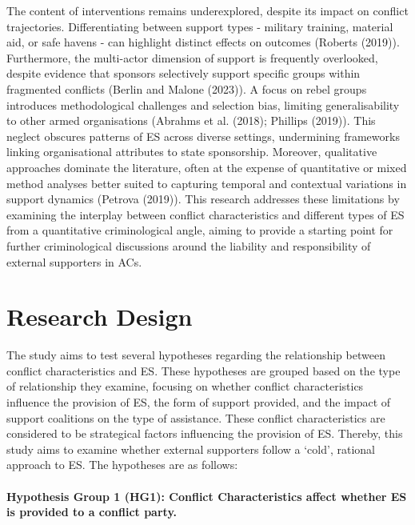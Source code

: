 \documentclass[
]{article}
\begin{document}
The content of interventions remains underexplored, despite its impact
on conflict trajectories. Differentiating between support types -
military training, material aid, or safe havens - can highlight distinct
effects on outcomes (Roberts (2019)). Furthermore, the multi-actor
dimension of support is frequently overlooked, despite evidence that
sponsors selectively support specific groups within fragmented conflicts
(Berlin and Malone (2023)). A focus on rebel groups introduces
methodological challenges and selection bias, limiting generalisability
to other armed organisations (Abrahms et al. (2018); Phillips (2019)).
This neglect obscures patterns of ES across diverse settings,
undermining frameworks linking organisational attributes to state
sponsorship. Moreover, qualitative approaches dominate the literature,
often at the expense of quantitative or mixed method analyses better
suited to capturing temporal and contextual variations in support
dynamics (Petrova (2019)). This research addresses these limitations by
examining the interplay between conflict characteristics and different
types of ES from a quantitative criminological angle, aiming to provide
a starting point for further criminological discussions around the
liability and responsibility of external supporters in ACs.

\section{Research Design}\label{research-design}

The study aims to test several hypotheses regarding the relationship
between conflict characteristics and ES. These hypotheses are grouped
based on the type of relationship they examine, focusing on whether
conflict characteristics influence the provision of ES, the form of
support provided, and the impact of support coalitions on the type of
assistance. These conflict characteristics are considered to be
strategical factors influencing the provision of ES. Thereby, this study
aims to examine whether external supporters follow a `cold', rational
approach to ES. The hypotheses are as follows:

\paragraph{Hypothesis Group 1 (HG1): Conflict Characteristics affect
whether ES is provided to a conflict
party.}\label{hypothesis-group-1-hg1-conflict-characteristics-affect-whether-es-is-provided-to-a-conflict-party.}
\end{document}
